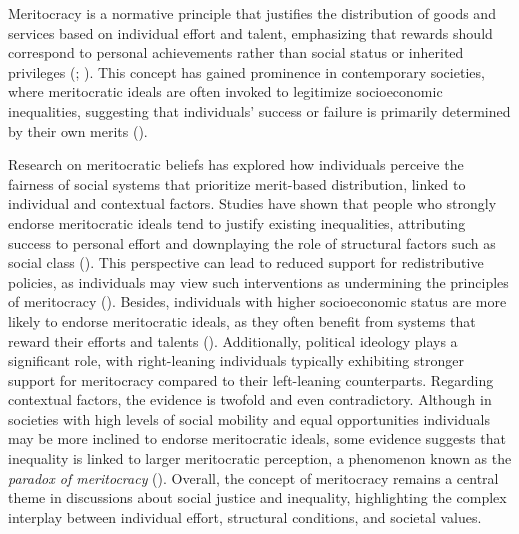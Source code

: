 \documentclass[
  12pt,
]{article}
\begin{document}
Meritocracy is a normative principle that justifies the distribution of
goods and services based on individual effort and talent, emphasizing
that rewards should correspond to personal achievements rather than
social status or inherited privileges
(;
). This concept has gained
prominence in contemporary societies, where meritocratic ideals are
often invoked to legitimize socioeconomic inequalities, suggesting that
individuals' success or failure is primarily determined by their own
merits ().

Research on meritocratic beliefs has explored how individuals perceive
the fairness of social systems that prioritize merit-based distribution,
linked to individual and contextual factors. Studies have shown that
people who strongly endorse meritocratic ideals tend to justify existing
inequalities, attributing success to personal effort and downplaying the
role of structural factors such as social class
(). This
perspective can lead to reduced support for redistributive policies, as
individuals may view such interventions as undermining the principles of
meritocracy ().
Besides, individuals with higher socioeconomic status are more likely to
endorse meritocratic ideals, as they often benefit from systems that
reward their efforts and talents
().
Additionally, political ideology plays a significant role, with
right-leaning individuals typically exhibiting stronger support for
meritocracy compared to their left-leaning counterparts. Regarding
contextual factors, the evidence is twofold and even contradictory.
Although in societies with high levels of social mobility and equal
opportunities individuals may be more inclined to endorse meritocratic
ideals, some evidence suggests that inequality is linked to larger
meritocratic perception, a phenomenon known as the \emph{paradox of
meritocracy} (). Overall,
the concept of meritocracy remains a central theme in discussions about
social justice and inequality, highlighting the complex interplay
between individual effort, structural conditions, and societal values.
\end{document}
